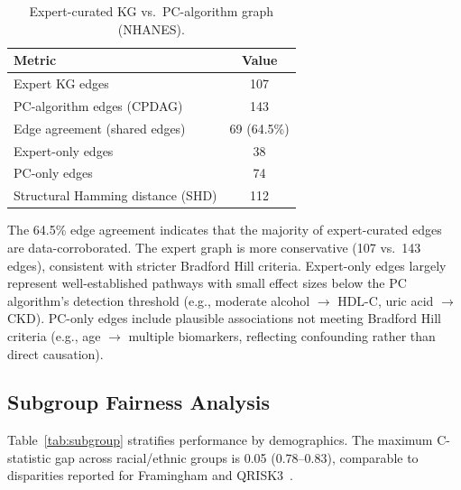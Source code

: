 \documentclass[runningheads]{llncs}
\begin{document}
\begin{table}[t]
\centering
\caption{Expert-curated KG vs.\ PC-algorithm graph (NHANES).}
\label{tab:pcalg}
\small
\begin{tabular}{@{}lc@{}}
\toprule
\textbf{Metric} & \textbf{Value} \\
\midrule
Expert KG edges                     & 107 \\
PC-algorithm edges (CPDAG)          & 143 \\
Edge agreement (shared edges)       & 69 (64.5\%) \\
Expert-only edges                   & 38 \\
PC-only edges                       & 74 \\
Structural Hamming distance (SHD)   & 112 \\
\bottomrule
\end{tabular}
\end{table}

The 64.5\% edge agreement indicates that the majority of
expert-curated edges are data-corroborated.  The expert graph is more
conservative (107 vs.\ 143 edges), consistent with stricter Bradford
Hill criteria.  Expert-only edges largely represent well-established
pathways with small effect sizes below the PC algorithm's detection
threshold (e.g., moderate alcohol $\rightarrow$ HDL-C, uric acid
$\rightarrow$ CKD).  PC-only edges include plausible associations not
meeting Bradford Hill criteria (e.g., age $\rightarrow$ multiple
biomarkers, reflecting confounding rather than direct causation).

\subsection{Subgroup Fairness Analysis}\label{sec:subgroup}

Table~\ref{tab:subgroup} stratifies performance by demographics.
The maximum C-statistic gap across racial/ethnic groups is 0.05
(0.78--0.83), comparable to disparities reported for
Framingham and QRISK3~\cite{hippisley2017qrisk3}.
\end{document}
